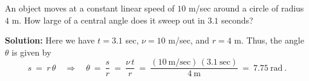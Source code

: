 \begin{exmp}
 An object moves at a constant linear speed of $10$ m/sec around a circle of radius $4$ m. How large
 of a central angle does it sweep out in $3.1$ seconds?\vspace{1mm}
 \par\noindent\textbf{Solution:} Here we have $t=3.1$ sec, $\nu=10$ m/sec, and $r=4$ m. Thus, the
 angle $\theta$ is given by
 \begin{displaymath}
  s ~=~ r\,\theta \quad\Rightarrow\quad \theta ~=~ \frac{s}{r} ~=~ \frac{\nu\,t}{r} ~=~
   \frac{(10~\text{m/sec})\,(3.1~\text{sec})}{4~\text{m}} ~=~ \boxed{7.75~\text{rad}} ~.
 \end{displaymath}
\end{exmp}
\divider
\vspace{1mm}

